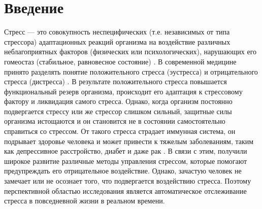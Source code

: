 \documentclass[14pt]{matmex-diploma-custom}
\begin{document}
\maketitle
\tableofcontents

\section*{Введение}
Стресс --- это совокупность неспецифических (т.е. независимых от типа стрессора)
адаптационных реакций организма на воздействие различных неблагоприятных
факторов (физических или психологических), нарушающих его гомеостаз (стабильное,
равновесное состояние) \cite{book:stress_of_life}. В современной медицине
принято разделять понятие положительного стресса (эустресса) и отрицательного
стресса (дистресса) \cite{article:eustress_distress}. В результате
положительного стресса повышается функциональный резерв организма, происходит
его адаптация к стрессовому фактору и ликвидация самого стресса. Однако, когда
организм постоянно подвергается стрессу или же стрессор слишком сильный,
защитные силы организма истощаются и он становится не в состоянии самостоятельно
справиться со стрессом. От такого стресса страдает иммунная система, он
подрывает здоровье человека и может привести к тяжелым заболеваниям, таким как
депрессивное расстройство, диабет и даже рак \cite{article:stress_and_illness}.
В связи с этим, получили широкое развитие различные методы управления стрессом,
которые помогают предупреждать его отрицательное воздействие. Однако, зачастую
человек не замечает или не осознает того, что подвергается воздействию стресса.
Поэтому перспективной областью исследования является автоматическое отслеживание
стресса в повседневной жизни в реальном времени.
\end{document}
